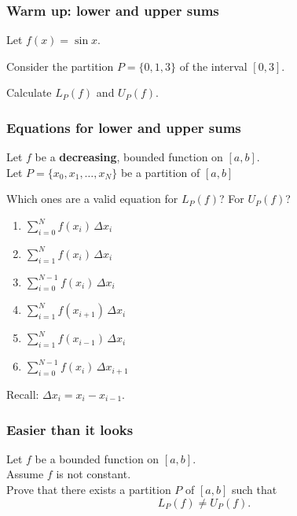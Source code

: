 \documentclass[14pt]{beamer}
\begin{document}
\begin{frame}[t]
	\frametitle{Warm up: lower and upper sums}

	Let $\displaystyle f(x) = \sin x$.

	Consider the partition $\displaystyle P= \{0, 1, 3\}$ of the interval
	$\displaystyle [0,3]$.

	Calculate $\displaystyle L_{P}(f)$ and $\displaystyle U_{P}(f)$.
\end{frame}

\begin{frame}[t]
	\fontsize{13}{13}\selectfont
	\frametitle{Equations for lower and upper sums}

	Let $f$ be a {\bfseries decreasing}, bounded function on $[a,b]$. \\ Let $\displaystyle
	P = \{x_{0}, x_{1}, \ldots, x_{N}\}$ be a partition of $[a,b]$

	Which ones are a valid equation for $L_{P}(f)$? For $U_{P}(f)$?

	\begin{multicols}{3}
		\begin{enumerate}
			\item $\displaystyle \sum_{i=0}^{N}f(x_{i}) \, \Delta x_{i}$

			\item $\displaystyle \sum_{i = 1}^{N}f(x_{i}) \, \Delta x_{i}$

			\item $\displaystyle \sum_{i = 0}^{N-1}f(x_{i}) \, \Delta x_{i}$

			\item $\displaystyle \sum_{i = 1}^{N}f(x_{i+1}) \, \Delta x_{i}$

			\item $\displaystyle \sum_{i = 1}^{N}f(x_{i-1}) \, \Delta x_{i}$

			\item $\displaystyle \sum_{i = 0}^{N-1}f(x_{i}) \, \Delta x_{i+1}$
		\end{enumerate}
	\end{multicols}

	Recall: $\displaystyle \Delta x_{i}= x_{i}- x_{i-1}$.
\end{frame}

\begin{frame}[t]
	\frametitle{Easier than it looks}

	Let $f$ be a bounded function on $[a,b]$. \\ Assume $f$ is not constant. \\
	Prove that there exists a partition $P$ of $[a,b]$ such that
	\[
		L_{P}(f) \neq U_{P}(f).
	\]
\end{frame}
\end{document}
